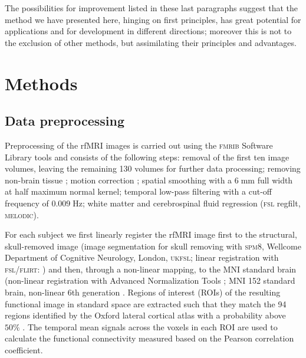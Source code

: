 \documentclass[%
]{frontiersSCNS-nologo} %
\renewcommand*{\|}{\mathpunct{|}}%
\begin{document}
The possibilities for improvement listed in these last paragraphs suggest that
the method we have presented here, hinging on first principles, has great
potential for applications and for development in different directions; moreover this is not to the exclusion of other methods, but assimilating
their principles and advantages.


\section{Methods}
 
\subsection{Data preprocessing}
\label{sec:ROI_selelection_and_conn_measure}


Preprocessing of the rfMRI images is carried out using the \textsc{fmrib}
Software Library tools \citep[\textsc{fsl},
v5.08:][]{Jenkinson2012,Smith2004} and consists of the following steps:
removal of the first ten image volumes, leaving the remaining 130 volumes
for further data processing; removing non-brain tissue
\citep[\textsc{Bet}:][]{smith2002c}; motion correction
\citep[\textsc{mcflirt}:][]{Jenkinson2002}; spatial smoothing with a
$6\;\mathrm{mm}$ full width at half maximum normal kernel; temporal
low-pass filtering with a cut-off frequency of $0.009\;\mathrm{Hz}$; white
matter and cerebrospinal fluid regression (\textsc{fsl} regfilt,
\textsc{melodic}).

\medskip

For each subject we first linearly register the rfMRI image first to the
structural, skull-removed image (image segmentation for skull removing with
\textsc{spm8}, Wellcome Department of Cognitive Neurology, London,
\textsc{ukfsl}; linear registration with \textsc{fsl}/\textsc{flirt}:
\citealt{Jenkinson2001,Jenkinson2002}) and then, through a non-linear
mapping, to the MNI standard brain (non-linear registration with Advanced
Normalization Tools \citep[\textsc{ANTs}:][]{Avants2011}; MNI 152 standard
brain, non-linear 6th generation \citep{Grabner2006}. Regions of interest
(ROIs) of the resulting functional image in standard space are extracted
such that they match the 94 regions identified by the Oxford lateral
cortical atlas with a probability above $50\%$ \citep{Desikan2006}. The
temporal mean signals across the voxels in each ROI are used to calculate
the functional connectivity measured based on the Pearson correlation
coefficient.
\end{document}
